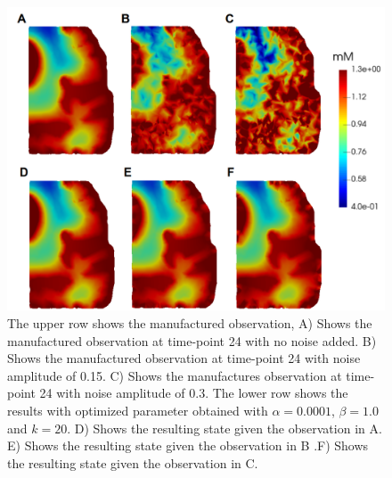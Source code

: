 \documentclass[12pt,a4paper]{article}
\begin{document}
\begin{figure}
\centering
\includegraphics[scale=0.4]{noise-12.png}  
\caption{The upper row shows the manufactured observation, A) Shows the manufactured observation at time-point 24 with no noise added. B) Shows the manufactured observation at time-point 24 with noise amplitude of 0.15. C) Shows the manufactures observation at time-point 24 with noise amplitude of 0.3. The lower row shows the results with optimized parameter obtained with $\alpha=0.0001$, $\beta=1.0$ and $k=20$. D) Shows the resulting state given the observation in A. E)  Shows the resulting state given the observation in B .F) Shows the resulting state given the observation in C. }
\label{12hourswithnoise}
\end{figure}
\end{document}

